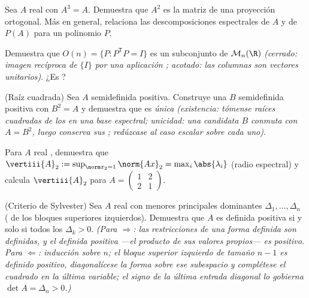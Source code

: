 \begin{exercise}[$\star\star$]\label{exo:b2:quadratic:4}
Sea $A$ real  con $A^3 = A$. Demuestra que $A^2$ es la
matriz de una proyección ortogonal. Más en general, relaciona las
descomposiciones espectrales de $A$ y de $P(A)$ para un polinomio
$P$.
\end{exercise}

\begin{exercise}[$\star\star$]\label{exo:b2:quadratic:5}
Demuestra que $O(n) = \{P : P^{\mathsf T}P = I\}$ es un subconjunto
 de $\mathcal{M}_n(\R)$ \emph{(cerrado: imagen recíproca de
$\{I\}$ por una aplicación ; acotado: las columnas son
vectores unitarios)}. ¿Es ?
\end{exercise}

\begin{exercise}[$\star\star$]\label{exo:b2:quadratic:6}
(Raíz cuadrada) Sea $A$  semidefinida positiva. Construye
una $B$  semidefinida positiva con $B^2 = A$ y demuestra
que es \emph{única} \emph{(existencia: tómense raíces cuadradas de
los  en una base espectral; unicidad: una candidata
$B$ conmuta con $A = B^2$, luego conserva sus ;
redúzcase al caso escalar sobre cada uno)}.
\end{exercise}

\begin{exercise}[$\star\star$]\label{exo:b2:quadratic:7}
Para $A$ real , demuestra que $\vertiii{A}_2 :=
\sup_{\norm x_2 = 1}\norm{Ax}_2 = \max_i \abs{\lambda_i}$ (radio
espectral) y calcula $\vertiii{A}_2$ para $A = \begin{pmatrix} 1 &
2\\ 2 & 1\end{pmatrix}$.
\end{exercise}

\begin{exercise}[$\star\star\star$]\label{exo:b2:quadratic:8}
(Criterio de Sylvester) Sea $A$ real  con menores
principales dominantes $\Delta_1, \dots, \Delta_n$
( de los bloques superiores izquierdos). Demuestra que
$A$ es definida positiva si y solo si todos los $\Delta_k > 0$.
\emph{(Para $\Rightarrow$: las restricciones de una forma definida
son definidas, y el  definida positiva ---el
producto de sus valores propios--- es positivo. Para $\Leftarrow$:
inducción sobre $n$; el bloque superior izquierdo de tamaño $n-1$ es
definido positivo, diagonalícese la forma sobre ese subespacio y
complétese el cuadrado en la última variable; el signo de la última
entrada diagonal lo gobierna $\det A = \Delta_n > 0$.)}
\end{exercise}

